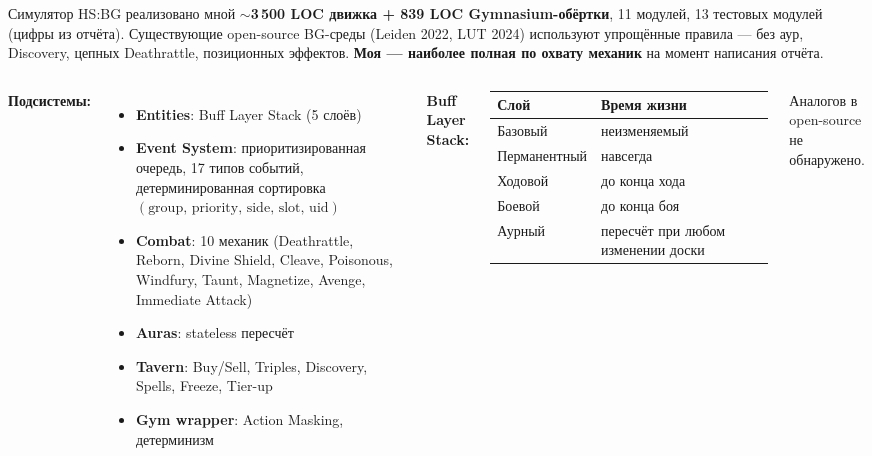 \documentclass[aspectratio=169,10pt]{beamer}
\begin{document}
\begin{frame}{Симулятор HS:BG \hfill {\small\normalfont реализовано мной}}
  \textbf{$\sim$3\,500 LOC движка + 839 LOC Gymnasium-обёртки}, 11 модулей, 13 тестовых модулей (цифры из отчёта). Существующие open-source BG-среды (Leiden 2022, LUT 2024) используют упрощённые правила --- без аур, Discovery, цепных Deathrattle, позиционных эффектов. \textbf{Моя --- наиболее полная по охвату механик} на момент написания отчёта.

  \vspace{0.3em}
  \begin{columns}[T]
    \textbf{Подсистемы:}
    \begin{itemize}\small
      \item \textbf{Entities}: Buff Layer Stack (5 слоёв)
      \item \textbf{Event System}: приоритизированная очередь, 17 типов событий, детерминированная сортировка $(\text{group},\,\text{priority},\,\text{side},\,\text{slot},\,\text{uid})$
      \item \textbf{Combat}: 10 механик (Deathrattle, Reborn, Divine Shield, Cleave, Poisonous, Windfury, Taunt, Magnetize, Avenge, Immediate Attack)
      \item \textbf{Auras}: stateless пересчёт
      \item \textbf{Tavern}: Buy/Sell, Triples, Discovery, Spells, Freeze, Tier-up
      \item \textbf{Gym wrapper}: Action Masking, детерминизм
    \end{itemize}

    \footnotesize
    \textbf{Buff Layer Stack:}
    \begin{tabular}{p{2.5cm}p{3.5cm}}
      \toprule
      \textbf{Слой} & \textbf{Время жизни} \\
      \midrule
      Базовый & неизменяемый \\
      Перманентный & навсегда \\
      Ходовой & до конца хода \\
      Боевой & до конца боя \\
      Аурный & пересчёт при любом изменении доски \\
      \bottomrule
    \end{tabular}
    \normalsize

    \vspace{0.5em}
    \small Аналогов в open-source не обнаружено.
  \end{columns}
\end{frame}
\end{document}
